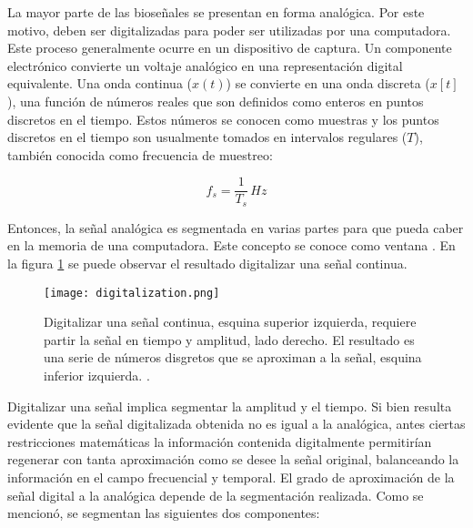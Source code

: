 La mayor parte de las bioseñales se presentan en forma analógica. Por este motivo, deben ser digitalizadas para poder ser utilizadas por una computadora. Este proceso generalmente ocurre en un dispositivo de captura. Un componente electrónico convierte un voltaje analógico en una representación digital equivalente. Una onda continua ($ x(t) $) se convierte en una onda discreta ($x[t]$), una función de números reales que son definidos como enteros en puntos discretos en el tiempo. Estos números se conocen como muestras y los puntos discretos en el tiempo son usualmente tomados en intervalos regulares ($T$), también conocida como frecuencia de muestreo:

$$ f_{s} = \frac{1}{T_{s}}\, Hz $$

Entonces, la señal analógica es segmentada en varias partes para que pueda caber en la memoria de una computadora. Este concepto se conoce como ventana \cite{biosignal-book}. En la figura \ref{fig:digitalization} se puede observar el resultado digitalizar una señal continua.

\begin{figure}[H]
	\centering
    \texttt{[image: digitalization.png]}
    \caption{Digitalizar una señal continua, esquina superior izquierda, requiere partir la señal en tiempo y amplitud, lado derecho. El resultado es una serie de números disgretos que se aproximan a la señal, esquina inferior izquierda.  \cite{biosignal-book}.}
	\label{fig:digitalization}
\end{figure}

Digitalizar una señal implica segmentar la amplitud y el tiempo. Si bien resulta evidente que la señal digitalizada obtenida no es igual a la analógica, antes ciertas restricciones matemáticas la información contenida digitalmente permitirían regenerar con tanta aproximación como se desee la señal original, balanceando la información en el campo frecuencial y temporal. El grado de aproximación de la señal digital a la analógica depende de la segmentación realizada. Como se mencionó, se segmentan las siguientes dos componentes:

